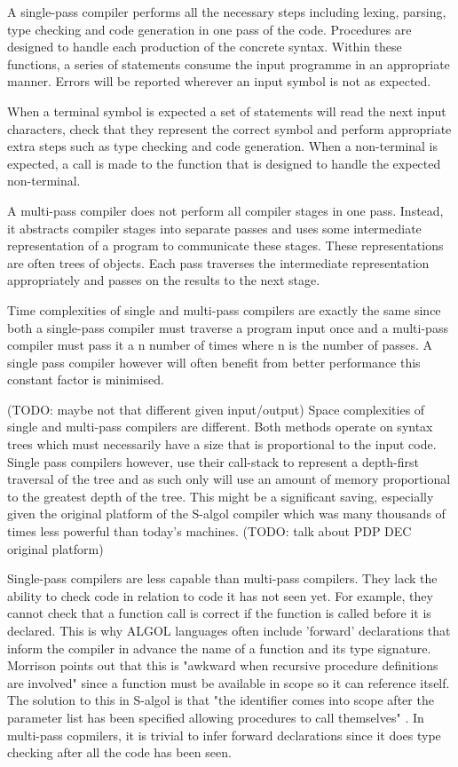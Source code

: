 \documentclass{article}
\begin{document}
A single-pass compiler performs all the necessary steps including lexing, parsing, type checking and code generation in one pass of the code. Procedures are designed to handle each production of the concrete syntax. Within these functions, a series of statements consume the input programme in an appropriate manner. Errors will be reported wherever an input symbol is not as expected. 

When a terminal symbol is expected a set of statements will read the next input characters, check that they represent the correct symbol and perform appropriate extra steps such as type checking and code generation. When a non-terminal is expected, a call is made to the function that is designed to handle the expected non-terminal.

A multi-pass compiler does not perform all compiler stages in one pass. Instead, it abstracts compiler stages into separate passes and uses some intermediate representation of a program to communicate these stages. These representations are often trees of objects. Each pass traverses the intermediate representation appropriately and passes on the results to the next stage.

Time complexities of single and multi-pass compilers are exactly the same since both a single-pass compiler must traverse a program input once and a multi-pass compiler must pass it a n number of times where n is the number of passes. A single pass compiler however will often benefit from better performance this constant factor is minimised.

(TODO: maybe not that different given input/output) Space complexities of single and multi-pass compilers are different. Both methods operate on syntax trees which must necessarily have a size that is proportional to the input code. Single pass compilers however, use their call-stack to represent a depth-first traversal of the tree and as such only will use an amount of memory proportional to the greatest depth of the tree. This might be a significant saving, especially given the original platform of the S-algol compiler which was many thousands of times less powerful than today's machines. (TODO: talk about PDP DEC original platform)

Single-pass compilers are less capable than multi-pass compilers. They lack the ability to check code in relation to code it has not seen yet. For example, they cannot check that a function call is correct if the function is called before it is declared. This is why ALGOL languages often include 'forward' declarations that inform the compiler in advance the name of a function and its type signature. Morrison points out that this is "awkward when recursive procedure definitions are involved" since a function must be available in scope so it can reference itself. The solution to this in S-algol is that "the identifier comes into scope after the parameter list has been specified allowing procedures to call themselves" \cite{morrison1979development}. In multi-pass copmilers, it is trivial to infer forward declarations since it does type checking after all the code has been seen.
\end{document}
